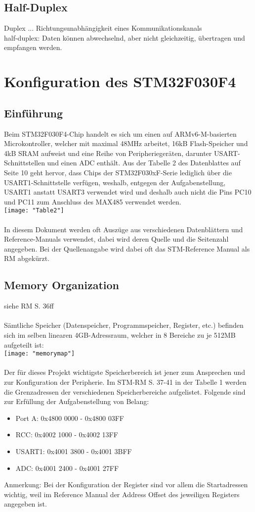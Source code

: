 \documentclass[11pt]{report}
\begin{document}
	\section{Half-Duplex}
		Duplex ... Richtungsunabhängigkeit eines Kommunikationskanals\\
		half-duplex: Daten können abwechselnd, aber nicht gleichzeitig, übertragen und empfangen werden.
	\chapter{Konfiguration des STM32F030F4}
	\section{Einführung}
		Beim STM32F030F4-Chip handelt es sich um einen auf ARMv6-M-basierten Microkontroller, welcher mit maximal 48MHz arbeitet, 16kB Flash-Speicher und 4kB SRAM aufweist und eine Reihe von Peripheriegeräten, darunter USART-Schnittstellen und einen ADC enthält. Aus der Tabelle 2 des Datenblattes auf Seite 10 geht hervor, dass Chips der STM32F030xF-Serie lediglich über die USART1-Schnittstelle verfügen, weshalb, entgegen der Aufgabenstellung, USART1 anstatt USART3 verwendet wird und deshalb auch nicht die Pins PC10 und PC11 zum Anschluss des MAX485 verwendet werden.\\
		\texttt{[image: "Table2"]}\\
		\\In diesem Dokument werden oft Auszüge aus verschiedenen Datenblättern und Reference-Manuals verwendet, dabei wird deren Quelle und die Seitenzahl angegeben. Bei der Quellenangabe wird dabei oft das STM-Reference Manual als RM abgekürzt.
	\section{Memory Organization}
		siehe RM S. 36ff\\
		\\Sämtliche Speicher (Datenspeicher, Programmspeicher, Register, etc.) befinden sich im selben linearen 4GB-Adressraum, welcher in 8 Bereiche zu je 512MB aufgeteilt ist:\\
		\texttt{[image: "memorymap"]}\\
		\\Der für dieses Projekt wichtigste Speicherbereich ist jener zum Ansprechen und zur Konfiguration der Peripherie. Im STM-RM S. 37-41 in der Tabelle 1 werden die Grenzadressen der verschiedenen Speicherbereiche aufgelistet. Folgende sind zur Erfüllung der Aufgabenstellung von Belang:
		\begin{itemize}
			\item Port A: 0x4800 0000 - 0x4800 03FF
			\item RCC: 0x4002 1000 - 0x4002 13FF
			\item USART1: 0x4001 3800 - 0x4001 3BFF
			\item ADC: 0x4001 2400 - 0x4001 27FF
		\end{itemize}
		Anmerkung: Bei der Konfiguration der Register sind vor allem die Startadressen wichtig, weil im Reference Manual der Address Offset des jeweiligen Registers angegeben ist.
\end{document}
